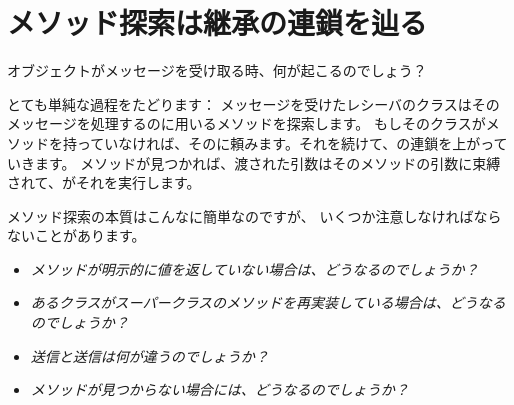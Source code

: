 \documentclass[a4paper,10pt,twoside]{book}
\begin{document}
\section{メソッド探索は継承の連鎖を辿る}


オブジェクトがメッセージを受け取る時、何が起こるのでしょう？

とても単純な過程をたどります：
メッセージを受けたレシーバのクラスはそのメッセージを処理するのに用いるメソッドを探索します。
もしそのクラスがメソッドを持っていなければ、そのに頼みます。それを続けて、の連鎖を上がっていきます。
メソッドが見つかれば、渡された引数はそのメソッドの引数に束縛されて、がそれを実行します。

メソッド探索の本質はこんなに簡単なのですが、
いくつか注意しなければならないことがあります。

\begin{itemize}
  \item \emph{メソッドが明示的に値を返していない場合は、どうなるのでしょうか？}
  \item \emph{あるクラスがスーパークラスのメソッドを再実装している場合は、どうなるのでしょうか？}
  \item \emph{送信と送信は何が違うのでしょうか？}
  \item \emph{メソッドが見つからない場合には、どうなるのでしょうか？}
\end{itemize}
\end{document}
